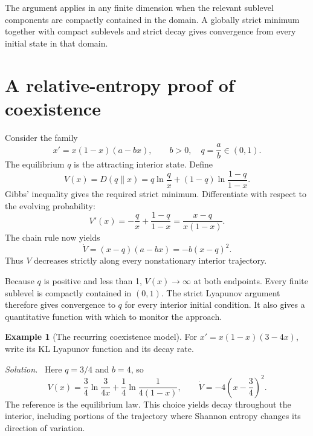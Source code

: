 \documentclass[11pt,oneside,openany]{book}
\theoremstyle{definition}
\newtheorem{example}{Example}[chapter]
\theoremstyle{remark}
\newenvironment{solution}{\par\smallskip\noindent\textit{Solution.}\ }{\par\smallskip}
\numberwithin{equation}{chapter}
\begin{document}
The argument applies in any finite dimension when the relevant sublevel components are compactly contained in the domain. A globally strict minimum together with compact sublevels and strict decay gives convergence from every initial state in that domain.

\section{A relative-entropy proof of coexistence}
Consider the family
\[
x'=x(1-x)(a-bx),\qquad b>0,\quad q=\frac ab\in(0,1).
\]
The equilibrium $q$ is the attracting interior state. Define
\begin{equation}\label{eq:binarylyap}
V(x)=D(q\|x)=q\ln\frac qx+(1-q)\ln\frac{1-q}{1-x}.
\end{equation}
Gibbs' inequality gives the required strict minimum. Differentiate with respect to the evolving probability:
\[
V'(x)=-\frac qx+\frac{1-q}{1-x}
=\frac{x-q}{x(1-x)}.
\]
The chain rule now yields
\begin{equation}\label{eq:kldecay}
\boxed{\dot V=(x-q)(a-bx)=-b(x-q)^2.}
\end{equation}
Thus $V$ decreases strictly along every nonstationary interior trajectory.

Because $q$ is positive and less than 1, $V(x)\to\infty$ at both endpoints. Every finite sublevel is compactly contained in $(0,1)$. The strict Lyapunov argument therefore gives convergence to $q$ for every interior initial condition. It also gives a quantitative function with which to monitor the approach.

\begin{example}[The recurring coexistence model]
For $x'=x(1-x)(3-4x)$, write its KL Lyapunov function and its decay rate.
\begin{solution}
Here $q=3/4$ and $b=4$, so
\[
V(x)=\frac34\ln\frac{3}{4x}+\frac14\ln\frac{1}{4(1-x)},
\qquad \dot V=-4\left(x-\frac34\right)^2.
\]
The reference is the equilibrium law. This choice yields decay throughout the interior, including portions of the trajectory where Shannon entropy changes its direction of variation.
\end{solution}
\end{example}
\end{document}
